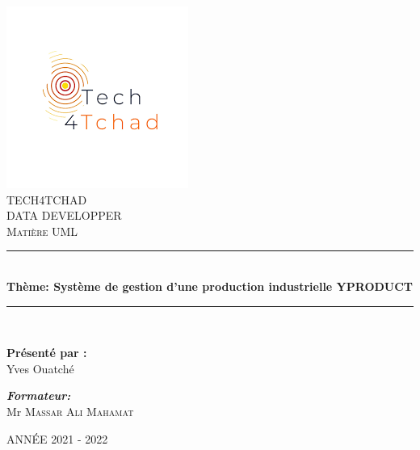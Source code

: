 \documentclass[12pt, openany]{report}
\newcommand{\HRule}{\rule{\linewidth}{0.5mm}}
\begin{document}
\begin{titlepage}
  \begin{sffamily}
  \begin{center}
  \includegraphics[scale=0.8]{index.jpg}~\\[1.5cm]
  \textsc{\LARGE TECH4TCHAD}\\[2cm]
\textsc{\Large DATA DEVELOPPER\\ }
\textsc{\Large Matière UML\\ }
    \HRule \\[0.4cm]
    { \huge \bfseries Thème: Système de gestion d'une production industrielle YPRODUCT
\\[0.4cm] }

    \HRule \\[2cm]

    \begin{minipage}{0.4\textwidth}
      \begin{flushleft} \large
      \textbf{ Présenté par :}\\
      Yves Ouatché\\
      \end{flushleft}
    \end{minipage}
    \begin{minipage}{0.4\textwidth}
      \begin{flushright} \large
        \emph{\textbf{Formateur:}}\\ Mr \textsc{ Massar Ali Mahamat}\\
      \end{flushright}
    \end{minipage}

    \vfill
    {\large ANNÉE 2021 - 2022 }

  \end{center}
  \end{sffamily}
\end{titlepage}
\newpage
\end{document}
